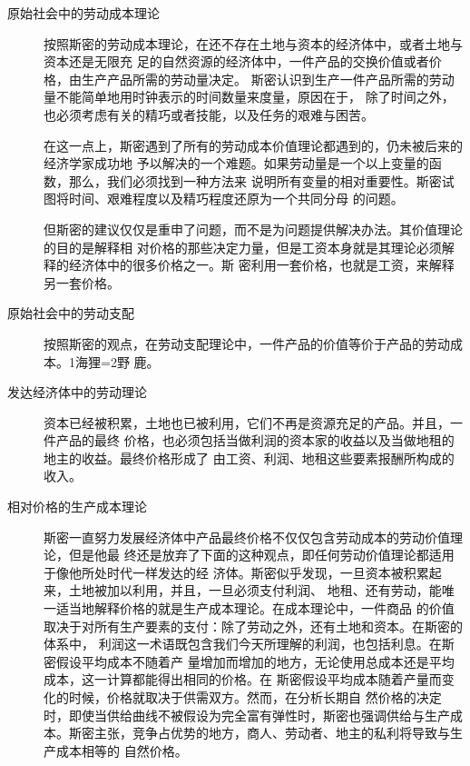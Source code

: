 \begin{description}
\item[原始社会中的劳动成本理论]

按照斯密的劳动成本理论，在还不存在土地与资本的经济体中，或者土地与资本还是无限充
足的自然资源的经济体中，一件产品的交换价值或者价格，由生产产品所需的劳动量决定。
斯密认识到生产一件产品所需的劳动量不能简单地用时钟表示的时间数量来度量，原因在于，
除了时间之外，也必须考虑有关的精巧或者技能，以及任务的艰难与困苦。

在这一点上，斯密遇到了所有的劳动成本价值理论都遇到的，仍未被后来的经济学家成功地
予以解决的一个难题。如果劳动量是一个以上变量的函数，那么，我们必须找到一种方法来
说明所有变量的相对重要性。斯密试图将时间、艰难程度以及精巧程度还原为一个共同分母
的问题。

但斯密的建议仅仅是重申了问题，而不是为问题提供解决办法。其价值理论的目的是解释相
对价格的那些决定力量，但是工资本身就是其理论必须解释的经济体中的很多价格之一。斯
密利用一套价格，也就是工资，来解释另一套价格。

\item[原始社会中的劳动支配]

按照斯密的观点，在劳动支配理论中，一件产品的价值等价于产品的劳动成本。1海狸=2野
鹿。

\item[发达经济体中的劳动理论]

  资本已经被积累，土地也已被利用，它们不再是资源充足的产品。并且，一件产品的最终
  价格，也必须包括当做利润的资本家的收益以及当做地租的地主的收益。最终价格形成了
  由工资、利润、地租这些要素报酬所构成的收入。


\item[相对价格的生产成本理论]

  斯密一直努力发展经济体中产品最终价格不仅仅包含劳动成本的劳动价值理论，但是他最
  终还是放弃了下面的这种观点，即任何劳动价值理论都适用于像他所处时代一样发达的经
  济体。斯密似乎发现，一旦资本被积累起来，土地被加以利用，并且，一旦必须支付利润、
  地租、还有劳动，能唯一适当地解释价格的就是生产成本理论。在成本理论中，一件商品
  的价值取决于对所有生产要素的支付：除了劳动之外，还有土地和资本。在斯密的体系中，
  利润这一术语既包含我们今天所理解的利润，也包括利息。在斯密假设平均成本不随着产
  量增加而增加的地方，无论使用总成本还是平均成本，这一计算都能得出相同的价格。在
  斯密假设平均成本随着产量而变化的时候，价格就取决于供需双方。然而，在分析长期自
  然价格的决定时，即使当供给曲线不被假设为完全富有弹性时，斯密也强调供给与生产成
  本。斯密主张，竞争占优势的地方，商人、劳动者、地主的私利将导致与生产成本相等的
  自然价格。
\end{description}

